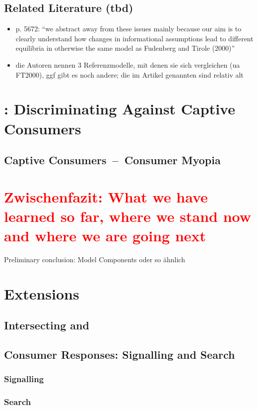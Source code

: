 \documentclass[a4paper, 11 pt, fleqn]{article}
\begin{document}
\subsection{Related Literature (tbd)}
\begin{itemize}
	\item p. 5672: ``we abstract away from these issues mainly because our aim is to clearly understand how changes in informational assumptions lead to different equilibria
	in otherwise the same model as Fudenberg and Tirole (2000)''
	\item die Autoren nennen 3 Referenzmodelle, mit denen sie sich vergleichen (ua FT2000), ggf gibt es noch andere; die im Artikel genannten sind relativ alt
\end{itemize}
%
\section{\citet{Armstrong.2019}: Discriminating Against Captive Consumers}
%
\subsection{Captive Consumers~--~Consumer Myopia}
%
\section{\textcolor{red}{Zwischenfazit: What we have learned so far, where we stand now and where we are going next}}
Preliminary conclusion: Model Components oder so ähnlich
%
\section{Extensions} \label{sec:extensions}
%
\subsection{Intersecting \citet{Choe.2018} and \citet{Armstrong.2019}}
%
\subsection{Consumer Responses: Signalling and Search}
%
\subsubsection{Signalling}
%
\subsubsection{Search}
%
\newpage
{}

\end{document}
